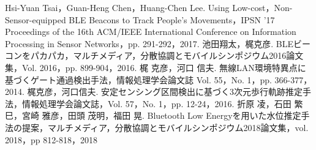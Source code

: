 \documentclass[Japanese]{dicomopapers}
\begin{document}
\begin{thebibliography}{20}
    Hsi-Yuan Tsai，Guan-Heng Chen，Huang-Chen Lee. Using Low-cost，Non-Sensor-equipped BLE Beacons to Track People's Movements，IPSN '17 Proceedings of the 16th ACM/IEEE International Conference on Information Processing in Sensor Networks，pp. 291-292，2017.
    池田翔太，梶克彦. BLEビーコンをパカパカ，マルチメディア，分散協調とモバイルシンポジウム2016論文集，Vol. 2016，pp. 899-904，2016.
    梶 克彦，河口 信夫. 無線LAN環境特異点に基づくゲート通過検出手法，情報処理学会論文誌 Vol. 55，No. 1，pp. 366-377，2014.
    梶克彦，河口信夫. 安定センシング区間検出に基づく3次元歩行軌跡推定手法，情報処理学会論文誌，Vol. 57，No. 1，pp. 12-24，2016.
    折原 凌，石田 繁巳，宮崎 雅彦，田頭 茂明，福田 晃. Bluetooth Low Energyを用いた水位推定手法の提案，マルチメディア，分散協調とモバイルシンポジウム2018論文集，vol. 2018，pp 812-818，2018 



\end{thebibliography}
\end{document}
